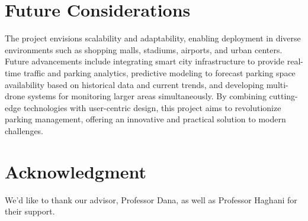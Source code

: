 \documentclass[conference]{IEEEtran}
\begin{document}
\section{Future Considerations}

The project envisions scalability and adaptability, 
enabling deployment in diverse environments such as shopping malls, 
stadiums, 
airports, 
and urban centers. 
Future advancements include integrating smart city infrastructure to provide real-time traffic and parking analytics, 
predictive modeling to forecast parking space availability based on historical data and current trends, 
and developing multi-drone systems for monitoring larger areas simultaneously. 
By combining cutting-edge technologies with user-centric design, 
this project aims to revolutionize parking management, 
offering an innovative and practical solution to modern challenges.

\section*{Acknowledgment}

We'd like to thank our advisor, Professor Dana, 
as well as Professor Haghani for their support.
\end{document}
